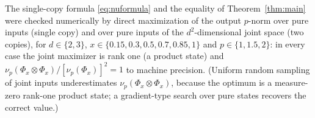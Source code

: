 \documentclass{amsart}
\theoremstyle{definition}
\begin{document}
The single-copy formula \eqref{eq:nuformula} and the equality of
Theorem~\ref{thm:main} were checked numerically by direct maximization of the
output $p$-norm over pure inputs (single copy) and over pure inputs of the
$d^{2}$-dimensional joint space (two copies), for $d\in\{2,3\}$,
$x\in\{0.15,0.3,0.5,0.7,0.85,1\}$ and $p\in\{1,1.5,2\}$: in every case the joint
maximizer is rank one (a product state) and
$\nu_p(\Phi_x\otimes\Phi_x)/[\nu_p(\Phi_x)]^{2}=1$ to machine precision.
(Uniform random sampling of joint inputs underestimates
$\nu_p(\Phi_x\otimes\Phi_x)$, because the optimum is a measure-zero rank-one
product state; a gradient-type search over pure states recovers the correct
value.)
\end{document}
